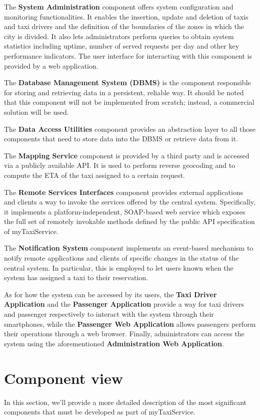 The \textbf{System Administration} component offers system configuration and monitoring functionalities. It enables the insertion, update and deletion of taxis and taxi drivers and the definition of the boundaries of the zones in which the city is divided. It also lets administrators perform queries to obtain system statistics including uptime, number of served requests per day and other key performance indicators. The user interface for interacting with this component is provided by a web application. 

The \textbf{Database Management System (DBMS)} is the component responsible for storing and retrieving data in a persistent, reliable way. It should be noted that this component will not be implemented from scratch; instead, a commercial solution will be used.

The \textbf{Data Access Utilities} component provides an abstraction layer to all those components that need to store data into the DBMS or retrieve data from it.

The \textbf{Mapping Service} component is provided by a third party and is accessed via a publicly available API. It is used to perform reverse geocoding and to compute the ETA of the taxi assigned to a certain request.

The \textbf{Remote Services Interfaces} component provides external applications and clients a way to invoke the services offered by the central system. Specifically, it implements a platform-independent, SOAP-based web service which exposes the full set of remotely invokable methods defined by the public API specification of myTaxiService.

The \textbf{Notification System} component implements an event-based mechanism to notify remote applications and clients of specific changes in the status of the central system. In particular, this is employed to let users known when the system has assigned a taxi to their reservation.

As for how the system can be accessed by its users, the \textbf{Taxi Driver Application} and the \textbf{Passenger Application} provide a way for taxi drivers and passenger respectively to interact with the system through their smartphones, while the \textbf{Passenger Web Application} allows passengers perform their operations through a web browser. Finally, administrators can access the system using the aforementioned \textbf{Administration Web Application}.



\section{Component view}
In this section, we'll provide a more detailed description of the most significant components that must be developed as part of myTaxiService.

